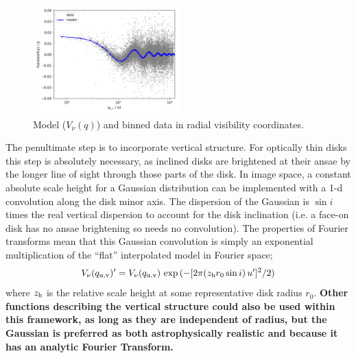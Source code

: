 \documentclass[fleqn,usenatbib]{mnras}
\begin{document}

\begin{figure}
    \centering
    \hspace{-0.5cm}\includegraphics[width=0.5\textwidth]{model.png}
    \caption{Model ($V_\nu(q)$) and binned data in radial visibility coordinates.}
    \label{fig:model}
\end{figure}

The penultimate step is to incorporate vertical structure. For optically thin disks this step is absolutely necessary, as inclined disks are brightened at their ansae by the longer line of sight through those parts of the disk. In image space, a constant absolute scale height for a Gaussian distribution can be implemented with a 1-d convolution along the disk minor axis. The dispersion of the Gaussian is $\sin i$ times the real vertical dispersion to account for the disk inclination (i.e. a face-on disk has no ansae brightening so needs no convolution). The properties of Fourier transforms mean that this Gaussian convolution is simply an exponential multiplication of the ``flat'' interpolated model in Fourier space;
\begin{equation}\label{eq:vert}
    V_\nu(q_{\rm u,v})' = V_\nu(q_{\rm u,v}) \, \exp{(-[2 \pi (z_{\rm h} r_0 \sin i) \, u']^2/2)}
\end{equation}
where $z_{\rm h}$ is the relative scale height at some representative disk radius $r_0$. \textbf{Other functions describing the vertical structure could also be used within this framework, as long as they are independent of radius, but the Gaussian is preferred as both astrophysically realistic \citep[e.g.][]{2019AJ....157..135M} and because it has an analytic Fourier Transform.}
\end{document}

